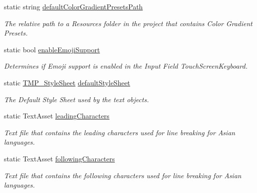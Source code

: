 \begin{DoxyCompactItemize}
static string \mbox{\hyperlink{class_t_m_pro_1_1_t_m_p___settings_a3a6d7260b925a52e2c0e10ef9b91aed6}{default\+Color\+Gradient\+Presets\+Path}}
\begin{DoxyCompactList}\small\item\em The relative path to a Resources folder in the project that contains Color Gradient Presets. \end{DoxyCompactList}\item 
static bool \mbox{\hyperlink{class_t_m_pro_1_1_t_m_p___settings_a6648f385cc57147ebb46f8cd159e78c9}{enable\+Emoji\+Support}}
\begin{DoxyCompactList}\small\item\em Determines if Emoji support is enabled in the Input Field Touch\+Screen\+Keyboard. \end{DoxyCompactList}\item 
static \mbox{\hyperlink{class_t_m_pro_1_1_t_m_p___style_sheet}{T\+M\+P\+\_\+\+Style\+Sheet}} \mbox{\hyperlink{class_t_m_pro_1_1_t_m_p___settings_aff54ac35a33c557259a6327c960b12b6}{default\+Style\+Sheet}}
\begin{DoxyCompactList}\small\item\em The Default Style Sheet used by the text objects. \end{DoxyCompactList}\item 
static Text\+Asset \mbox{\hyperlink{class_t_m_pro_1_1_t_m_p___settings_a7f094fc99cec843b82d393fd3f3b2d25}{leading\+Characters}}
\begin{DoxyCompactList}\small\item\em Text file that contains the leading characters used for line breaking for Asian languages. \end{DoxyCompactList}\item 
static Text\+Asset \mbox{\hyperlink{class_t_m_pro_1_1_t_m_p___settings_a05637d0bf743beb9317c129c960bc654}{following\+Characters}}
\begin{DoxyCompactList}\small\item\em Text file that contains the following characters used for line breaking for Asian languages. \end{DoxyCompactList}\item 

\end{DoxyCompactItemize}
